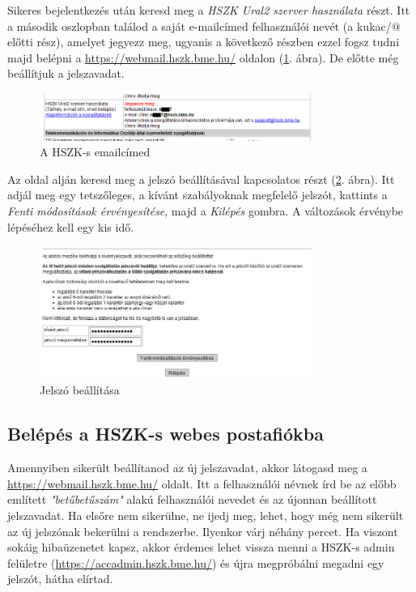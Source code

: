 \documentclass[a4paper,10pt,titlepage]{article}
\begin{document}
Sikeres bejelentkezés után keresd meg a \textit{HSZK Ural2 szerver használata} részt. Itt a második oszlopban találod a saját e-mailcímed felhasználói nevét (a kukac/@ előtti rész), amelyet jegyezz meg, ugyanis a következő részben ezzel fogsz tudni majd belépni a \href{https://webmail.hszk.bme.hu/}{https://webmail.hszk.bme.hu/} oldalon (\ref{fig:hszk_acc_admin_mailcim}. ábra). De előtte még beállítjuk a jelszavadat.

\begin{figure}[h!]
\centering
\includegraphics[width=0.80\textwidth]{figures/hszk_acc_admin_mailcim.png}
\caption{A HSZK-s emailcímed \label{fig:hszk_acc_admin_mailcim}}
\end{figure}

Az oldal alján keresd meg a jelszó beállításával kapcsolatos részt (\ref{fig:hszk_acc_admin_jelszo}. ábra). Itt adjál meg egy tetszőleges, a kívánt szabályoknak megfelelő jelszót, kattints a \textit{Fenti módosítások érvényesítése}, majd a \textit{Kilépés} gombra. A változások érvénybe lépéséhez kell egy kis idő. 

\begin{figure}[h!]
\centering
\includegraphics[width=0.80\textwidth]{figures/hszk_acc_admin_jelszo.png}
\caption{Jelszó beállítása \label{fig:hszk_acc_admin_jelszo}}
\end{figure}

\subsection{Belépés a HSZK-s webes postafiókba}

Amennyiben sikerült beállítanod az új jelszavadat, akkor látogasd meg a \href{https://webmail.hszk.bme.hu/}{https://webmail.hszk.bme.hu/} oldalt. Itt a felhasználói névnek írd be az előbb említett \textit{"betűbetűszám"} alakú felhasználói nevedet és az újonnan beállított jelszavadat. Ha elsőre nem sikerülne, ne ijedj meg, lehet, hogy még nem sikerült az új jelszónak bekerülni a rendszerbe. Ilyenkor várj néhány percet. Ha viszont sokáig hibaüzenetet kapsz, akkor érdemes lehet vissza menni a HSZK-s admin felületre (\href{https://accadmin.hszk.bme.hu/}{https://accadmin.hszk.bme.hu/}) és újra megpróbálni megadni egy jelszót, hátha elírtad.
\end{document}

